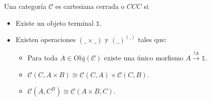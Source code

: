 \documentclass{article}
\begin{document}
\begin{definition}
   Una categoría $\mathcal{C}$ es cartesiana cerrada o $CCC$ si
   \begin{itemize}
    \item Existe un objeto terminal $\mathbb{1}$.
    \item Existen operaciones $(\_\times\_)$ y $(\_)^{(\_)}$ tales que:
    \begin{itemize}
        \item Para toda $A \in \mathrm{Obj}(\mathcal{C})$ existe una único 
              morfismo $A \xrightarrow{!A} \mathbb{1}$.
        \item $\mathcal{C}(C, A \times B) \cong \mathcal{C}(C, A) \times \mathcal{C}(C, B)$.
        \item $\mathcal{C}(A, C^{B}) \cong \mathcal{C}(A \times B, C)$.
    \end{itemize}
   \end{itemize}
\end{definition}
\end{document}
